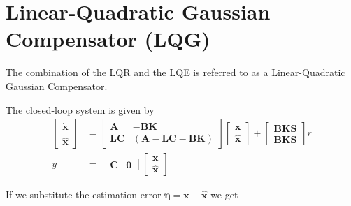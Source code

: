 \section{Linear-Quadratic Gaussian Compensator (LQG)}

The combination of the LQR and the LQE is referred to as a Linear-Quadratic Gaussian Compensator.

\newpar{}

\begin{center}
    
\end{center}

The closed-loop system is given by
\begin{align*}
    \begin{bmatrix}
        \dot{\textbf{x}} \\
        \dot{\hat{\textbf{x}}}
    \end{bmatrix}
      & =
    \begin{bmatrix}
        \mathbf{A}  & - \mathbf{BK}                         \\
        \mathbf{LC} & (\mathbf{A}-\mathbf{LC}-\mathbf{BK})
    \end{bmatrix}
    \begin{bmatrix}
        \textbf{x} \\
        \hat{\textbf{x}}
    \end{bmatrix}
    +
    \begin{bmatrix}
        \mathbf{BKS} \\
        \mathbf{BKS}
    \end{bmatrix}
    r                            \\
    y & = \begin{bmatrix}
              \mathbf{C} & \mathbf{0}
          \end{bmatrix}
    \begin{bmatrix}
        \textbf{x} \\
        \hat{\textbf{x}}
    \end{bmatrix}
\end{align*}

If we substitute the estimation error $\bm{\eta}=\textbf{x}-\hat{\textbf{x}}$ we get

